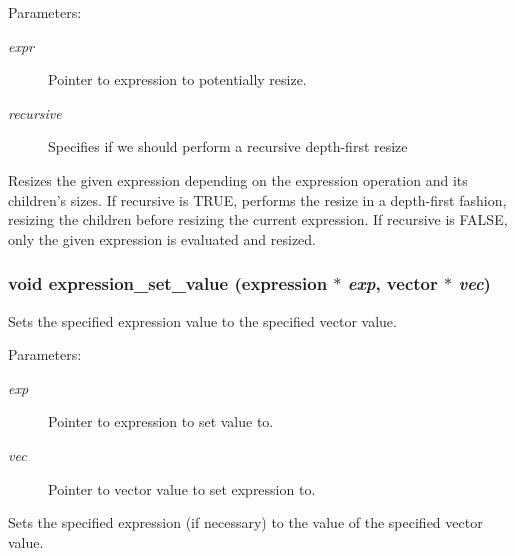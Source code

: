 \begin{Desc}
\item[Parameters:]
\begin{description}
\item[{\em expr}]Pointer to expression to potentially resize. \item[{\em recursive}]Specifies if we should perform a recursive depth-first resize\end{description}
\end{Desc}
Resizes the given expression depending on the expression operation and its children's sizes. If recursive is TRUE, performs the resize in a depth-first fashion, resizing the children before resizing the current expression. If recursive is FALSE, only the given expression is evaluated and resized. 
\subsubsection{\setlength{\rightskip}{0pt plus 5cm}void expression\_\-set\_\-value ({\bf expression} $\ast$ {\em exp}, {\bf vector} $\ast$ {\em vec})}\label{expr_8h_a2}


Sets the specified expression value to the specified vector value. 

\begin{Desc}
\item[Parameters:]
\begin{description}
\item[{\em exp}]Pointer to expression to set value to. \item[{\em vec}]Pointer to vector value to set expression to.\end{description}
\end{Desc}
Sets the specified expression (if necessary) to the value of the specified vector value. 